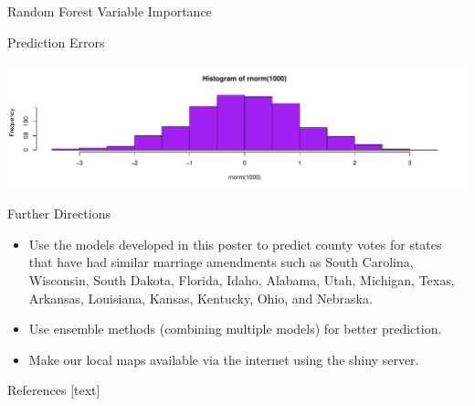 \documentclass[final]{beamer}\usepackage[]{graphicx}\usepackage[]{color}
\makeatletter
\def\maxwidth{ %
  \ifdim\Gin@nat@width>\linewidth
    \linewidth
  \else
    \Gin@nat@width
  \fi
}
\newenvironment{knitrout}{}{} %
\makeatother
\begin{document}
\begin{frame}[fragile]
\begin{columns}[t]
\begin{column}{0.23\linewidth}
\begin{minipage}[t][.955\textheight]{\linewidth}
\begin{block}{Random Forest Variable Importance}
\begin{knitrout}
{}



\end{knitrout}
\vspace{0ex}
\vfill
\end{block}
\vfill

\begin{block}{Prediction Errors}
\begin{knitrout}
\color{fgcolor}

{\centering \includegraphics[width=\maxwidth]{figure/HIST3-1} 

}



\end{knitrout}
\vspace{0ex}
\vfill
\end{block}
\vfill

\begin{block}{Further Directions}
\begin{itemize}
\item Use the models developed in this poster to predict county votes for states that have had similar marriage amendments such as South Carolina, Wisconsin, South Dakota, Florida, Idaho, Alabama, Utah, Michigan, Texas, Arkansas, Louisiana, Kansas, Kentucky, Ohio, and Nebraska. 
\item  Use ensemble methods (combining multiple models) for better prediction.
\item  Make our local maps available via the internet using the shiny server.
\end{itemize}
\vspace{0ex}
\vfill
\end{block}
\vfill

\begin{block}{References}
\footnotesize
{}[text]
\vspace{-1ex}



\normalsize
\vfill
\end{block} 
\vfill

\end{minipage}
\end{column}%




\end{columns}
\end{frame}
\end{document}
